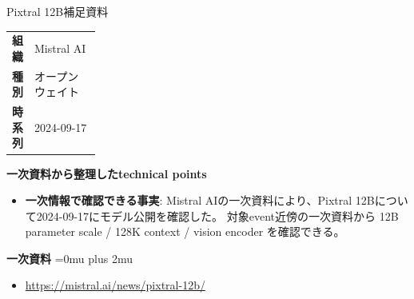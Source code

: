 \begin{technicalnote}{Pixtral 12B}{補足資料}
\begingroup
\begin{tabularx}{\linewidth}{@{}>{\bfseries}p{0.22\linewidth}X@{}}
組織 & Mistral AI \\
種別 & オープンウェイト \\
時系列 & 2024-09-17 \\
\end{tabularx}
\smallskip
{\bfseries 一次資料から整理したtechnical points}
\begin{itemize}[leftmargin=1.5em,itemsep=0.35em]
\item \textbf{一次情報で確認できる事実}: Mistral AIの一次資料により、Pixtral 12Bについて2024-09-17にモデル公開を確認した。 対象event近傍の一次資料から 12B parameter scale / 128K context / vision encoder を確認できる。
\end{itemize}
\begin{minipage}{\linewidth}
\begin{samepage}
{\bfseries 一次資料}
\begingroup\sloppy
\Urlmuskip=0mu plus 2mu\relax
\begin{itemize}[leftmargin=1.5em,itemsep=0.25em]
\item {\scriptsize\url{https://mistral.ai/news/pixtral-12b/}}
\end{itemize}
\endgroup
\end{samepage}
\end{minipage}
\endgroup
\end{technicalnote}
\medskip

